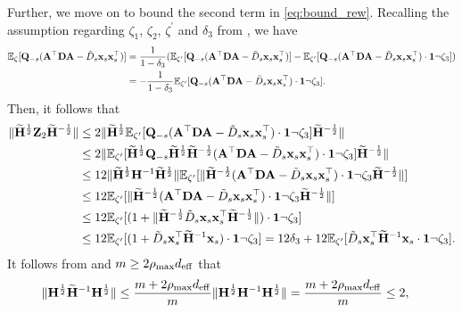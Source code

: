 \documentclass[11pt,a4paper]{article}
\begin{document}
Further, we move on to  bound the second  term in \eqref{eq:bound_rew}.  Recalling the  assumption   regarding  $\zeta_1$, $\zeta_2$, $\zeta^{'}$ and $\delta_3$   from , we   have 
 \begin{align}
      {\mathbb{E}}_{\zeta}[\mathbf{Q}_{-s}(\mathbf{A}^\top\mathbf{D}\mathbf{A}-\tilde D_{s}\mathbf{x}_s\mathbf{x}^\top_s)]&=\frac{1}{1-\delta_3}( {\mathbb{E}}_{\zeta'}[\mathbf{Q}_{-s}(\mathbf{A}^\top\mathbf{D}\mathbf{A}-\tilde D_{s}\mathbf{x}_s\mathbf{x}^\top_s)]-{\mathbb{E}}_{\zeta'}[\mathbf{Q}_{-s}(\mathbf{A}^\top\mathbf{D}\mathbf{A}-\tilde D_{s}\mathbf{x}_s\mathbf{x}^\top_s)\cdot\mathbf{1}\neg\zeta_3])\nonumber\\
      &=-\frac{1}{1-\delta_3}{\mathbb{E}}_{\zeta'}[\mathbf{Q}_{-s}(\mathbf{A}^\top\mathbf{D}\mathbf{A}-\tilde D_{s}\mathbf{x}_s\mathbf{x}^\top_s)\cdot\mathbf{1}\neg\zeta_3].\nonumber
 \end{align}
Then, it follows that
 \begin{align}
       \|\widetilde{\mathbf{H}}^{\frac{1}{2}}\mathbf{Z}_2\widetilde{\mathbf{H}}^{-\frac{1}{2}}\|&\leq 2\|\widetilde{\mathbf{H}}^{\frac{1}{2}}{\mathbb{E}}_{\zeta'}[\mathbf{Q}_{-s}(\mathbf{A}^\top\mathbf{D}\mathbf{A}-\tilde D_{s}\mathbf{x}_s\mathbf{x}^\top_s) \cdot\mathbf{1} \neg\zeta_3] \widetilde{\mathbf{H}}^{-\frac{1}{2}}\|\nonumber\\
      & \leq 2\|{\mathbb{E}}_{\zeta'}[\widetilde{\mathbf{H}}^{\frac{1}{2}}\mathbf{Q}_{-s}\widetilde{\mathbf{H}}^{\frac{1}{2}}\widetilde{\mathbf{H}}^{-\frac{1}{2}}(\mathbf{A}^\top\mathbf{D}\mathbf{A}-\tilde D_{s}\mathbf{x}_s\mathbf{x}^\top_s) \cdot\mathbf{1} \neg\zeta_3] \widetilde{\mathbf{H}}^{-\frac{1}{2}}\|\nonumber\\
       &\leq 12\|\widetilde{\mathbf{H}}^{\frac{1}{2}}\mathbf{H}^{-1}\widetilde{\mathbf{H}}^{\frac{1}{2}}\|{\mathbb{E}}_{\zeta'}[\|\widetilde{\mathbf{H}}^{-\frac{1}{2}}(\mathbf{A}^\top\mathbf{D}\mathbf{A}-\tilde D_{s}\mathbf{x}_s\mathbf{x}^\top_s) \cdot\mathbf{1} \neg\zeta_3\widetilde{\mathbf{H}}^{-\frac{1}{2}}\|] \nonumber\\
      & \leq 12{\mathbb{E}}_{\zeta'}[\|\widetilde{\mathbf{H}}^{-\frac{1}{2}}(\mathbf{A}^\top\mathbf{D}\mathbf{A}-\tilde D_{s}\mathbf{x}_s\mathbf{x}^\top_s) \cdot\mathbf{1} \neg\zeta_3 \widetilde{\mathbf{H}}^{-\frac{1}{2}}\|]\nonumber\\
      & \leq 12{\mathbb{E}}_{\zeta'}[(1+\|\widetilde{\mathbf{H}}^{-\frac{1}{2}}\tilde D_{s}\mathbf{x}_s\mathbf{x}^\top_s\widetilde{\mathbf{H}}^{-\frac{1}{2}}\|)\cdot\mathbf{1} \neg\zeta_3 ]\nonumber\\
      & \leq 12{\mathbb{E}}_{\zeta'}[(1+\tilde D_{s}\mathbf{x}_s^\top\widetilde{\mathbf{H}}^{-1}\mathbf{x}_s)\cdot\mathbf{1} \neg\zeta_3 ]=12\delta_3+12{\mathbb{E}}_{\zeta'}[\tilde D_{s}\mathbf{x}_s^\top\widetilde{\mathbf{H}}^{-1}\mathbf{x}_s\cdot\mathbf{1} \neg\zeta_3 ].\nonumber
 \end{align}
It follows from  and $m\geq 2\rho_{\max} d_{\mathrm{eff}}$ that
\begin{align}\label{eq:h_wilde_h_h}
   \|\mathbf{H}^{\frac{1}{2}}\widetilde{\mathbf{H}}^{-1}\mathbf{H}^{\frac{1}{2}}\|&\leq \frac{m+2\rho_{\max} d_{\mathrm{eff}}}{m}\|\mathbf{H}^{\frac{1}{2}}\mathbf{H}^{-1}\mathbf{H}^{\frac{1}{2}}\|=\frac{m+2\rho_{\max} d_{\mathrm{eff}}}{m} \leq 2,
\end{align}
\end{document}
